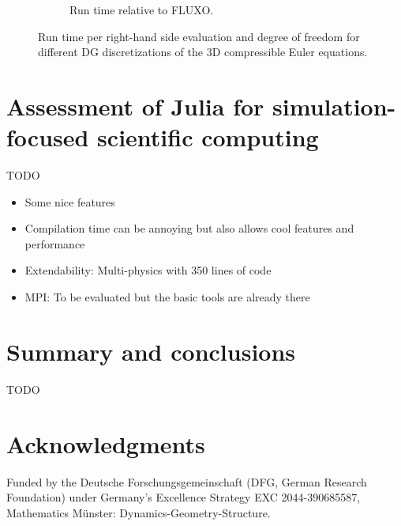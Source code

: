 \documentclass{juliacon}
\begin{document}
\begin{figure}
\begin{subfigure}{\linewidth}
    \caption{Run time relative to FLUXO.}
  \end{subfigure}%
  \caption{Run time per right-hand side evaluation and degree of freedom for
           different DG discretizations of the 3D compressible Euler equations.}
  \label{fig:PID-Euler}
\end{figure}



\section{Assessment of Julia for simulation-focused scientific computing}

TODO %
\begin{itemize}
  \item Some nice features
  \item Compilation time can be annoying but also allows cool features and performance
  \item Extendability: Multi-physics with 350 lines of code \cite{schlottkelakemper2021purely}
  \item MPI: To be evaluated but the basic tools are already there \cite{byrne2021mpi}
\end{itemize}




\section{Summary and conclusions}

TODO %



\section*{Acknowledgments}

Funded by the Deutsche Forschungsgemeinschaft (DFG, German Research Foundation)
under Germany's Excellence Strategy EXC 2044-390685587, Mathematics Münster:
Dynamics-Geometry-Structure.
\end{document}
